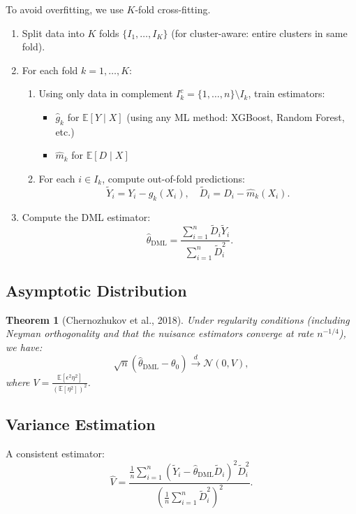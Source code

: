 \documentclass[12pt]{article}
\numberwithin{equation}{section}
\newtheorem{theorem}{Theorem}[section]
\begin{document}
	To avoid overfitting, we use $K$-fold cross-fitting.
	
	\begin{enumerate}
		\item Split data into $K$ folds $\{I_1, \dots, I_K\}$ (for cluster-aware: entire clusters in same fold).
		\item For each fold $k = 1, \dots, K$:
		\begin{enumerate}
			\item Using only data in complement $I_k^c = \{1,\dots,n\} \setminus I_k$, train estimators:
			\begin{itemize}
				\item $\hat{g}_k$ for $\mathbb{E}[Y \mid X]$ (using any ML method: XGBoost, Random Forest, etc.)
				\item $\hat{m}_k$ for $\mathbb{E}[D \mid X]$
			\end{itemize}
			\item For each $i \in I_k$, compute out-of-fold predictions:
			\[
			\tilde{Y}_i = Y_i - \hat{g}_k(X_i), \quad \tilde{D}_i = D_i - \hat{m}_k(X_i).
			\]
		\end{enumerate}
		\item Compute the DML estimator:
		\[
		\hat{\theta}_{\text{DML}} = \frac{\sum_{i=1}^n \tilde{D}_i \tilde{Y}_i}{\sum_{i=1}^n \tilde{D}_i^2}.
		\]
	\end{enumerate}
	
	\subsection{Asymptotic Distribution}
	
	\begin{theorem}[Chernozhukov et al., 2018]
		Under regularity conditions (including Neyman orthogonality and that the nuisance estimators converge at rate $n^{-1/4}$), we have:
		\[
		\sqrt{n} (\hat{\theta}_{\text{DML}} - \theta_0) \xrightarrow{d} \mathcal{N}(0, V),
		\]
		where $V = \frac{\mathbb{E}[\epsilon^2 \eta^2]}{(\mathbb{E}[\eta^2])^2}$.
	\end{theorem}
	
	\subsection{Variance Estimation}
	
	A consistent estimator:
	\[
	\hat{V} = \frac{\frac{1}{n} \sum_{i=1}^n (\tilde{Y}_i - \hat{\theta}_{\text{DML}} \tilde{D}_i)^2 \tilde{D}_i^2}{\left( \frac{1}{n} \sum_{i=1}^n \tilde{D}_i^2 \right)^2}.
	\]
	
\end{document}
